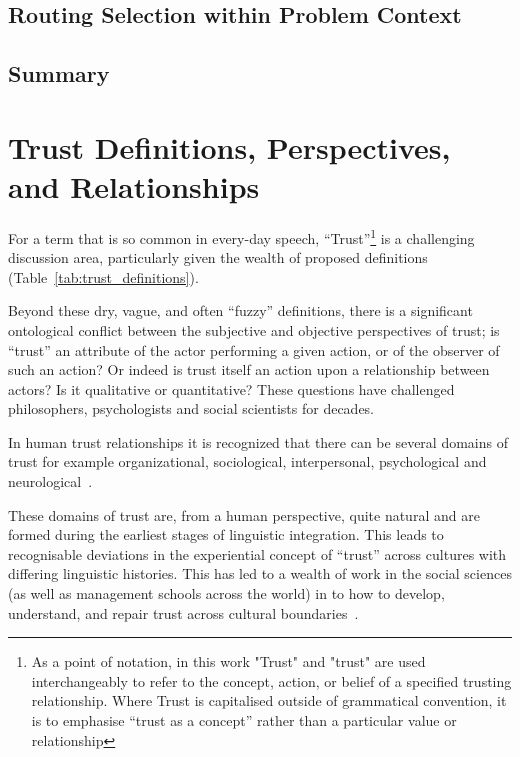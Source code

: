 \subsection{Routing Selection within Problem Context }
\begin{comment}
Initial comment suggested taking from the above table and somehow ``scoring'' each cell against the problem statement. IMO this would make no sense and we're
effectively scoring the problem statement against the routing applicability which is massively subjective.
\end{comment}


\subsection{Summary}


\section{Trust Definitions, Perspectives, and Relationships}\label{sec:trust_defs}
For a term that is so common in every-day speech, ``Trust''\footnote{As a point of notation, in this work "Trust" and "trust" are used interchangeably to refer to the concept, action, or belief of a specified trusting relationship. Where Trust is capitalised outside of grammatical convention, it is to emphasise ``trust as a concept'' rather than a particular value or relationship} is a challenging discussion area, particularly given the wealth of proposed definitions (Table~\ref{tab:trust_definitions}).

Beyond these dry, vague, and often ``fuzzy'' definitions, there is a significant ontological conflict between the subjective and objective perspectives of trust; is ``trust'' an attribute of the actor performing a given action, or of the observer of such an action? Or indeed is trust itself an action upon a relationship between actors? Is it qualitative or quantitative? These questions have challenged philosophers, psychologists and social scientists for decades.

In human trust relationships it is recognized that there can be several domains of trust for example organizational, sociological, interpersonal, psychological and neurological~\cite{Lee2004}.

These domains of trust are, from a human perspective, quite natural and are formed during the earliest stages of linguistic integration.
This leads to recognisable deviations in the experiential concept of ``trust'' across cultures with differing linguistic histories.
This has led to a wealth of work in the social sciences (as well as management schools across the world) in to how to develop, understand, and repair trust across cultural boundaries~\cite{Okumura2011}.

